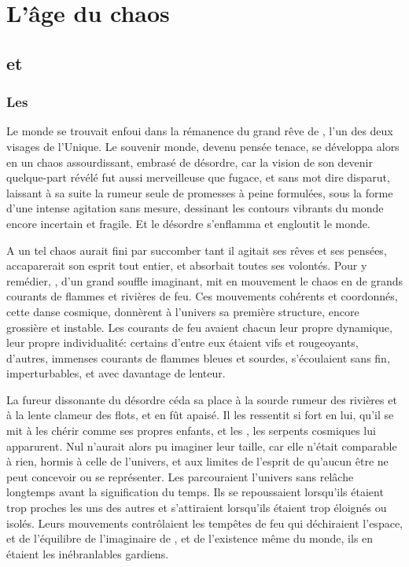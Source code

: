 \chapter{L'âge du chaos}


\section{\Mey et \Cind}


\subsection{Les \SC}


Le monde se trouvait enfoui dans la rémanence du grand rêve de \Mey, l'un des deux visages de l'Unique. Le souvenir monde, devenu pensée tenace, se développa alors en un chaos assourdissant, embrasé de désordre, car la vision de son devenir quelque-part révélé fut aussi merveilleuse que fugace, et sans mot dire disparut, laissant à sa suite la rumeur seule de promesses à peine formulées, sous la forme d'une intense agitation sans mesure, dessinant les contours vibrants du monde encore incertain et fragile. Et le désordre s'enflamma et engloutit le monde.

A un tel chaos \Mey aurait fini par succomber tant il agitait ses rêves et ses pensées, accaparerait son esprit tout entier, et absorbait toutes ses volontés. Pour y remédier, \Cind, d'un grand souffle imaginant, mit en mouvement le chaos en de grands courants de flammes et rivières de feu. Ces mouvements cohérents et coordonnés, cette danse cosmique, donnèrent à l'univers sa première structure, encore grossière et instable. Les courants de feu avaient chacun leur propre dynamique, leur propre individualité: certains d'entre eux étaient vifs et rougeoyants, d'autres, immenses courants de flammes bleues et sourdes, s'écoulaient sans fin, imperturbables, et avec davantage de lenteur.

La fureur dissonante du désordre céda sa place à la sourde rumeur des rivières et à la lente clameur des flots, et \Mey en fût apaisé. Il les ressentit si fort en lui, qu'il se mit à les chérir comme ses propres enfants, et les \SC, les serpents cosmiques lui apparurent. Nul n'aurait alors pu imaginer leur taille, car elle n'était comparable à rien, hormis à celle de l'univers, et aux limites de l'esprit de \Mey qu'aucun être ne peut concevoir ou se représenter. Les \SC parcouraient l'univers sans relâche longtemps avant la signification du temps. Ils se repoussaient lorsqu'ils étaient trop proches les uns des autres et s'attiraient lorsqu'ils étaient trop éloignés ou isolés. Leurs mouvements contrôlaient les tempêtes de feu qui déchiraient l'espace, et de l'équilibre de l'imaginaire de \Mey, et de l'existence même du monde, ils en étaient les inébranlables gardiens.


